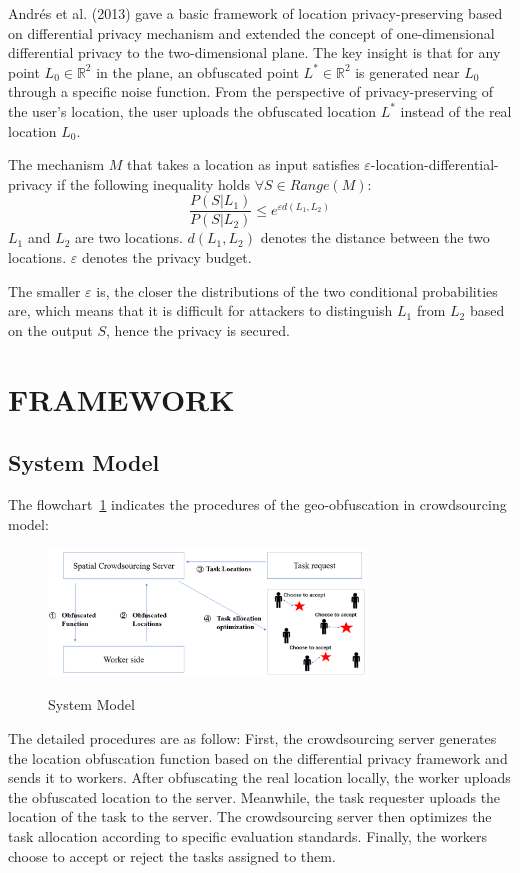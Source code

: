 Andrés et al. (2013) gave a basic framework of location privacy-preserving based on differential privacy mechanism and extended the concept of one-dimensional differential privacy to the two-dimensional plane. The key insight is that for any point $L_0 \in \mathbb R^2$ in the plane, an obfuscated point $L^* \in \mathbb R^2$ is generated near $L_0$ through a specific noise function. From the perspective of privacy-preserving of the user's location, the user uploads the obfuscated location $L^*$ instead of the real location $L_0$.

\begin{definition}
	The mechanism $M$ that takes a location as input satisfies $\varepsilon$-location-differential-privacy if the following inequality holds $\forall S \in Range(M)$: 
	$$
	\frac{P(S|L_1)}{P(S|L_2)} \leq e^{\varepsilon d(L_1,L_2)}
	$$
	$L_1$ and $L_2$ are two locations. $d(L_1,L_2)$ denotes the distance between the two locations. $\varepsilon$ denotes the privacy budget. 
\end{definition}
 The smaller $\varepsilon$ is, the closer the distributions of the two conditional probabilities are, which means that it is difficult for attackers to distinguish $L_1$ from $L_2$ based on the output $S$, hence the privacy is secured.

\section{FRAMEWORK}
\subsection{System Model}
The flowchart~\ref{img:SysModel} indicates the procedures of the geo-obfuscation in crowdsourcing model:

\begin{figure}
\includegraphics[width=8.5cm]{SysModel}
\label{img:SysModel}
\caption{System Model}
\end{figure}

The detailed procedures are as follow:
First, the crowdsourcing server generates the location obfuscation function based on the differential privacy framework and sends it to workers. After obfuscating the real location locally, the worker uploads the obfuscated location to the server. Meanwhile, the task requester uploads the location of the task to the server. The crowdsourcing server then optimizes the task allocation according to specific evaluation standards. Finally, the workers choose to accept or reject the tasks assigned to them.

